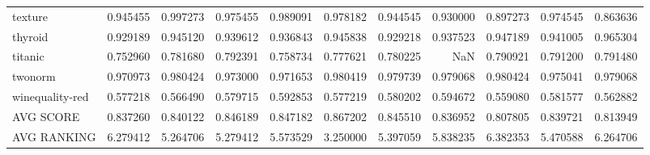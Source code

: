 \begin{tabular}{lrrrrrrrrrr}
texture         &   0.945455 &  0.997273 &  0.975455 &  0.989091 &  0.978182 &  0.944545 &  0.930000 &  0.897273 &  0.974545 &  0.863636 \\
thyroid         &   0.929189 &  0.945120 &  0.939612 &  0.936843 &  0.945838 &  0.929218 &  0.937523 &  0.947189 &  0.941005 &  0.965304 \\
titanic         &   0.752960 &  0.781680 &  0.792391 &  0.758734 &  0.777621 &  0.780225 &       NaN &  0.790921 &  0.791200 &  0.791480 \\
twonorm         &   0.970973 &  0.980424 &  0.973000 &  0.971653 &  0.980419 &  0.979739 &  0.979068 &  0.980424 &  0.975041 &  0.979068 \\
winequality-red &   0.577218 &  0.566490 &  0.579715 &  0.592853 &  0.577219 &  0.580202 &  0.594672 &  0.559080 &  0.581577 &  0.562882 \\
AVG SCORE       &   0.837260 &  0.840122 &  0.846189 &  0.847182 &  0.867202 &  0.845510 &  0.836952 &  0.807805 &  0.839721 &  0.813949 \\
AVG RANKING     &   6.279412 &  5.264706 &  5.279412 &  5.573529 &  3.250000 &  5.397059 &  5.838235 &  6.382353 &  5.470588 &  6.264706 \\
\bottomrule
\end{tabular}
